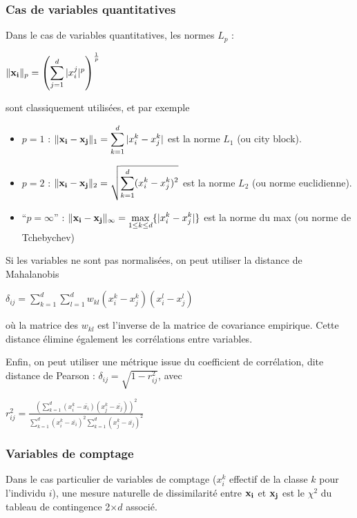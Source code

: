 \documentclass[letterpaper,10pt,english]{jupyterBook}
\begin{document}
\subsubsection{Cas de variables quantitatives}
\label{\detokenize{clustering:cas-de-variables-quantitatives}}
\sphinxAtStartPar
Dans le cas de variables quantitatives, les normes  \(L_p\) :

\sphinxAtStartPar
\(\|{\bf x_i}\|_p=\left (\displaystyle\sum_{j=1}^d|x_i^j|^p\right ) ^\frac{1}{p}\)

\sphinxAtStartPar
sont classiquement utilisées, et par exemple
\begin{itemize}
\item {} 
\sphinxAtStartPar
\(p=1\) : \(\|{\bf x_i}-{\bf x_j}\|_1=\displaystyle\sum_{k=1}^d|x_i^k-x_j^k|\) est la norme \(L_1\) (ou city block).

\item {} 
\sphinxAtStartPar
\(p=2\) : \(\|{\bf x_i}-{\bf x_j}\|_2=\sqrt{\displaystyle\sum_{k=1}^d(x_i^k-x_j^k)^2}\) est la norme \(L_2\) (ou norme euclidienne).

\item {} 
\sphinxAtStartPar
“\(p=\infty\)” : \(\|{\bf x_i}-{\bf x_j}\|_\infty = \displaystyle\max_{1\leq k\leq d}\{|x_i^k-x_j^k|\}\) est la norme du max (ou norme de Tchebychev)

\end{itemize}

\sphinxAtStartPar
Si les variables ne sont pas normalisées, on peut utiliser la distance de Mahalanobis

\sphinxAtStartPar
\(\delta_{ij} = \displaystyle\sum_{k=1}^d\displaystyle\sum_{l=1}^dw_{kl}(x_i^k-x_j^k)(x_i^l-x_j^l)\)

\sphinxAtStartPar
où la matrice des \(w_{kl}\) est l’inverse de la matrice de covariance empirique. Cette distance élimine également les corrélations entre variables.

\sphinxAtStartPar
Enfin, on peut utiliser une métrique issue du coefficient de corrélation, dite distance de Pearson : \(\delta_{ij} =\sqrt{1-r^2_{ij}}\), avec

\sphinxAtStartPar
\(r^2_{ij} = \frac{\left (\displaystyle\sum_{k=1}^d (x_i^k-\bar{x_i})(x_j^k-\bar{x_j})\right )^2}{\displaystyle\sum_{k=1}^d(x_i^k-\bar{x_i})^2\displaystyle\sum_{k=1}^d(x_j^k-\bar{x_j})^2}\)


\subsubsection{Variables de comptage}
\label{\detokenize{clustering:variables-de-comptage}}
\sphinxAtStartPar
Dans le cas particulier de variables de comptage (\(x_i^k\) effectif de la classe \(k\) pour l’individu \(i\)), une mesure naturelle de dissimilarité entre \({\bf x_i}\) et \({\bf x_j}\) est le \(\chi^2\) du tableau de contingence 2\(\times d\) associé.
\end{document}
